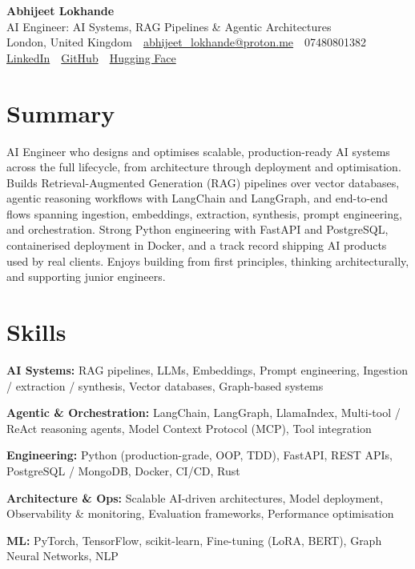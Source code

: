 \documentclass[10pt,a4paper]{article}
\newcommand{\sep}{\,\textcolor{accent!60}{\textbar}\,}
\begin{document}
\begin{center}
  {\fontsize{24}{26}\selectfont\bfseries Abhijeet Lokhande}\\[3pt]
  {\color{accent}\large AI Engineer: AI Systems, RAG Pipelines \& Agentic Architectures}\\[5pt]
  {\small
    London, United Kingdom \sep
    \href{mailto:abhijeet_lokhande@proton.me}{abhijeet\_lokhande@proton.me} \sep
    07480801382 \\[2pt]
    \href{https://www.linkedin.com/in/ablds/}{LinkedIn} \sep
    \href{https://github.com/abhijeetscode}{GitHub} \sep
    \href{https://huggingface.co/ab-ai}{Hugging Face}
  }
\end{center}
\vspace{2pt}

\section{Summary}
AI Engineer who designs and optimises scalable, production-ready AI systems across the full lifecycle, from architecture through deployment and optimisation. Builds Retrieval-Augmented Generation (RAG) pipelines over vector databases, agentic reasoning workflows with LangChain and LangGraph, and end-to-end flows spanning ingestion, embeddings, extraction, synthesis, prompt engineering, and orchestration. Strong Python engineering with FastAPI and PostgreSQL, containerised deployment in Docker, and a track record shipping AI products used by real clients. Enjoys building from first principles, thinking architecturally, and supporting junior engineers.

\section{Skills}
\begin{tight}
  \item[\textcolor{accent}{\small$\bullet$}] \textbf{AI Systems:} RAG pipelines, LLMs, Embeddings, Prompt engineering, Ingestion / extraction / synthesis, Vector databases, Graph-based systems
  \item[\textcolor{accent}{\small$\bullet$}] \textbf{Agentic \& Orchestration:} LangChain, LangGraph, LlamaIndex, Multi-tool / ReAct reasoning agents, Model Context Protocol (MCP), Tool integration
  \item[\textcolor{accent}{\small$\bullet$}] \textbf{Engineering:} Python (production-grade, OOP, TDD), FastAPI, REST APIs, PostgreSQL / MongoDB, Docker, CI/CD, Rust
  \item[\textcolor{accent}{\small$\bullet$}] \textbf{Architecture \& Ops:} Scalable AI-driven architectures, Model deployment, Observability \& monitoring, Evaluation frameworks, Performance optimisation
  \item[\textcolor{accent}{\small$\bullet$}] \textbf{ML:} PyTorch, TensorFlow, scikit-learn, Fine-tuning (LoRA, BERT), Graph Neural Networks, NLP
\end{tight}
\end{document}
